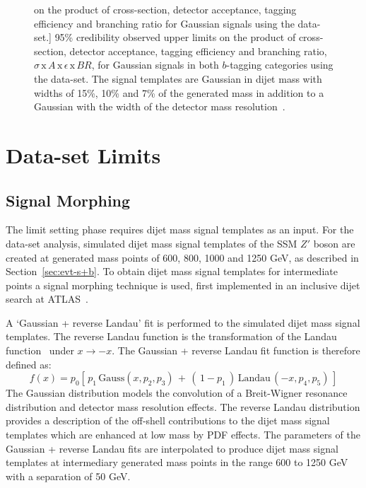\begin{figure}[!ht]
    on the product of cross-section, detector acceptance, tagging efficiency and branching ratio
    for Gaussian signals using the \summer{} data-set.]
  {95\% credibility observed upper limits
    on the product of cross-section, detector acceptance, tagging efficiency and branching ratio,
    $\sigma\,\text{x}\,\mathit{A}\,\text{x}\,\epsilon\,\text{x}\,\mathit{BR}$,
    for Gaussian signals in both $b$-tagging categories using the \summer{} data-set.
    The signal templates are Gaussian in dijet  mass with
    widths of 15\%, 10\% and 7\% of the generated mass
    in addition to a Gaussian with the width of the detector mass resolution~\cite{dibjet-ichep_conf}.
  }
  \label{fig:lim-summer_gauss}
\end{figure}

\vfill
\clearpage

\section{\lm{} Data-set Limits}
\label{sec:lim-full}
\vspace{-0.5em}

\subsection{Signal Morphing}
\label{sec:lim-full_morphing}
\vspace{-0.3em}

The limit setting phase requires dijet mass signal templates as an input.
For the \lm{} data-set analysis, simulated dijet mass signal templates of the SSM $Z'$ boson are created at generated mass points of
600, 800, 1000 and 1250 GeV, as described in Section~\ref{sec:evt-s+b}.
To obtain dijet mass signal templates for intermediate points a signal morphing technique is used,
first implemented in an inclusive dijet search at ATLAS~\cite{dijet-mori17_paper}.

A `Gaussian + reverse Landau' fit is performed to the simulated dijet mass signal templates.
The reverse Landau function is the transformation of the Landau function~\cite{lim-landau} under $x\to-x$.
The Gaussian + reverse Landau fit function is therefore defined as:
\begin{equation}
  f(x)=p_0 \left[ \,p_1\,\mathrm{Gauss}\left(x,p_2,p_3\right)\,+\,\left(\,1-p_1\,\right)\,\mathrm{Landau}\,\left(-x,p_4,p_5\right)\, \right]
\end{equation}
The Gaussian distribution models the convolution of a Breit-Wigner resonance distribution and detector mass resolution effects.
The reverse Landau distribution provides a description of the off-shell contributions to the dijet mass signal templates which are enhanced at low mass by PDF effects.
The parameters of the Gaussian + reverse Landau fits are interpolated to produce dijet mass signal templates at intermediary generated mass points
in the range 600 to 1250 GeV with a separation of 50 GeV.


